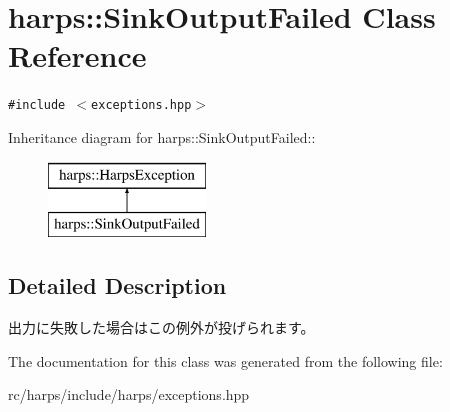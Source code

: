 \section{harps::SinkOutputFailed Class Reference}
\label{classharps_1_1SinkOutputFailed}
{\tt \#include $<$exceptions.hpp$>$}

Inheritance diagram for harps::SinkOutputFailed::\begin{figure}[H]
\begin{center}
\leavevmode
\includegraphics[height=2cm]{classharps_1_1SinkOutputFailed}
\end{center}
\end{figure}


\subsection{Detailed Description}
出力に失敗した場合はこの例外が投げられます。 

The documentation for this class was generated from the following file:\begin{CompactItemize}
\item 
rc/harps/include/harps/exceptions.hpp\end{CompactItemize}
